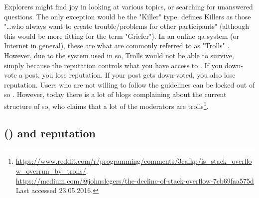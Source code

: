 Explorers might find joy in looking at various topics, or searching for unanswered questions.
The only exception would be the "Killer" type. 
\textcite[p.~3]{Maan2013} defines Killers as those "\ldots who always want to create trouble/problems for other participants" (although this would be more fitting for the term "Griefer"). 
In an online \gls{qa} system (or Internet in general), these are what are commonly referred to as "Trolls" \cite{Fosdick2012, Atwood2015}. 
However, due to the system used in \gls{so}, Trolls would not be able to survive, simply because the reputation controls what you have access to \cite{StackOverflow.com2016g}. 
If you down-vote a post, you lose reputation. 
If your post gets down-voted, you also lose reputation. 
Users who are not willing to follow the guidelines can be locked out of \gls{so} \cite{Atwood2009}.
However, today there is a lot of blogs complaining about the current structure of \gls{so}, who claims that a lot of the moderators are
trolls\footnote{\url{https://www.reddit.com/r/programming/comments/3cafkp/is_stack_overflow_overrun_by_trolls/}. \\	
	\url{https://medium.com/@johnslegers/the-decline-of-stack-overflow-7cb69faa575d} \\ 
	Last accessed 23.05.2016. 
}.

\subsection[Stack Overflow and reputation]{ () and reputation}
\label{sec:research_on_so}

